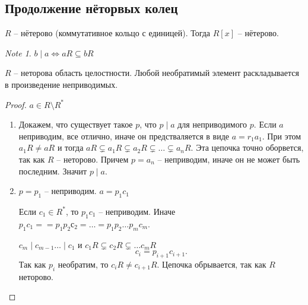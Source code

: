 \documentclass[11pt]{book}
\newcommand{\Z}{\mathbb{Z}}
\theoremstyle{definition}
\theoremstyle{plain}
\theoremstyle{plain}
\theoremstyle{definition}
\theoremstyle{remark}
\newtheorem*{note}{Note}
\begin{document}
\subsection{Продолжение нёторвых колец}
\begin{thm}
    $ R$ -- нётерово (коммутативное кольцо с единицей). Тогда $ R[x]$ -- нётерово.
\end{thm}
\begin{note}
    $ b \mid a \Leftrightarrow aR \subseteq bR$
\end{note}
\begin{thm}
    $ R$ -- неторова область целостности. Любой необратимый элемент раскладывается в произведение неприводимых.
\end{thm}
\begin{proof}
    $ a \in  R \setminus R^{*}$ 
    \begin{enumerate}
	\item Докажем, что существует такое $ p$, что $ p \mid a$ для неприводимого $ p$.
	     Если $ a$ неприводим, все отлично, иначе он предстваляется в виде
	     $ a = r_1 a_1$.
	     При этом $ a_1R \ne aR$ и тогда $ aR \subsetneq a_1R \subsetneq  a_2R \subsetneq \ldots \subsetneq a_nR$. Эта цепочка точно оборвется, так как $ R$ -- неторово. Причем $ p = a_n$ -- неприводим, иначе он не может быть последним.
	     Значит $ p \mid a$.
	 \item $ p = p_1$ -- неприводим.
	     $ a = p_1 c_1 $

	     Если $ c_1 \in  R^{*}$, то $ p_1c_1 $ -- неприводим.
	     Иначе $ p_1c_1 = = p_1 p_2с_2 = \ldots  = p_1 p_2 \ldots p_m c_m$.

	     $ c_m \mid c_{m-1} \ldots \mid c_1$ и $ c_1R \subsetneq c_2R \subsetneq  \ldots c_m R$  %
	     \[
	     c_i = p_{i+1} c_{i+1}
	     .\] 
	     Так как $ p_i$ необратим, то $ c_i R \ne c_{i+1}R$. Цепочка  обрывается, так как  $ R$ неторово.
    \end{enumerate}
\end{proof}
\end{document}
